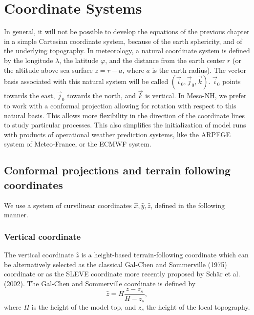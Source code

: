
\chapter{Coordinate Systems}
\minitoc
 

In general, it will not be possible to develop the equations of the previous
chapter in a simple Cartesian coordinate system, because
of the earth sphericity, and of the underlying topography.
In meteorology, a natural coordinate system is defined by the longitude
$\lambda$, the latitude $\varphi$, and the distance from the earth center $r$
(or the altitude above sea surface $z=r-a$, where $a$ is the earth radius).
The vector basis associated with this natural system will be called
$(\vec{i}_0, \vec{j}_0,\vec{k})$. $\vec{i}_0$ points towards the east,
$\vec{j}_0$ towards the north, and $\vec{k}$ is vertical.
In Meso-NH, we prefer to work with a conformal
projection allowing for rotation with respect to this natural basis.
This allows more flexibility in the direction of the coordinate lines
to study particular processes. This also simplifies the initialization
of model runs with products of operational weather prediction systems,
like the ARPEGE system of Meteo-France, or the ECMWF system.

\section{Conformal projections and terrain following coordinates}

We use a system of curvilinear coordinates $\widehat{x},\widehat{y},
\widehat{z}$, defined in the following manner.

\subsection{Vertical coordinate}
The vertical coordinate $\hat z$ is a height-based 
terrain-following coordinate which can be alternatively selected as 
the classical Gal-Chen and Sommerville (1975) coordinate or as the 
SLEVE coordinate more recently proposed by Sch\"ar et al. (2002).   
The Gal-Chen and Sommerville coordinate is defined by 
\begin{equation}
\hat z = H \frac{z-z_s}{H-z_s},
\end{equation}
where $H$ is the height of the model top, and $z_s$ the height of the local
topography.

